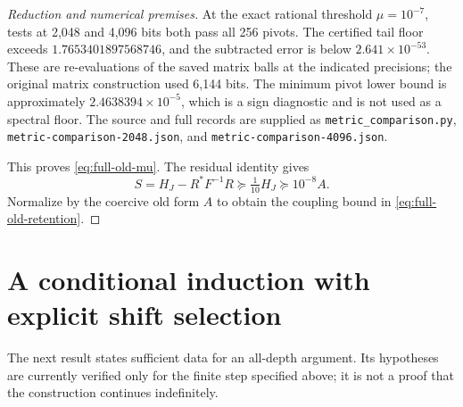 \documentclass[11pt]{article}
\theoremstyle{remark}\newtheorem{remark}[theorem]{Remark}
\begin{document}
\begin{proof}[Reduction and numerical premises]
At the exact rational threshold \(\mu=10^{-7}\), tests at 2,048 and 4,096 bits
both pass all 256 pivots. The certified tail floor exceeds
\(1.7653401897568746\), and the subtracted error is below
\(2.641\times10^{-53}\). These are re-evaluations of the saved matrix balls
at the indicated precisions; the original matrix construction used 6,144 bits.
The minimum pivot lower bound is approximately \(2.4638394\times10^{-5}\),
which is a sign diagnostic and is not used as a spectral floor.
The source and full records are supplied as
\texttt{metric\_comparison.py}, \texttt{metric-comparison-2048.json}, and
\texttt{metric-comparison-4096.json}.

This proves \eqref{eq:full-old-mu}. The residual identity gives
\[
 S=H_J-R^*F^{-1}R\succeq\tfrac1{10}H_J\succeq10^{-8}A.
\]
Normalize by the coercive old form \(A\) to obtain the coupling bound in
\eqref{eq:full-old-retention}.
\end{proof}

\section{A conditional induction with explicit shift selection}
\label{sec:conditional-induction}

The next result states sufficient data for an all-depth argument. Its
hypotheses are currently verified only for the finite step specified above;
it is not a proof that the construction continues indefinitely.
\end{document}
